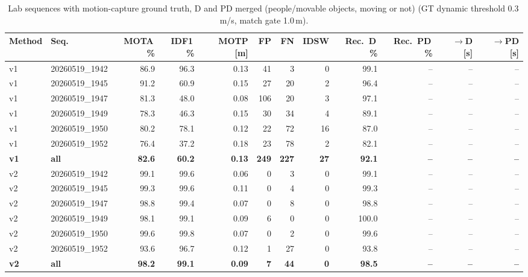 \begin{table}[t]
\centering
\caption{Lab sequences with motion-capture ground truth, D and PD merged (people/movable objects, moving or not) (GT dynamic threshold 0.3\,m/s, match gate 1.0\,m).}
\label{tab:own_r9a_merged}
\setlength{\tabcolsep}{3pt}
\begin{tabular}{llrrrrrrrrrr}
\toprule
Method & Seq. & MOTA\,\% & IDF1\,\% & MOTP [m] & FP & FN & IDSW & Rec.\ D\,\% & Rec.\ PD\,\% & $\to$D [s] & $\to$PD [s] \\
\midrule
v1 & 20260519\_1942 & 86.9 & 96.3 & 0.13 & 41 & 3 & 0 & 99.1 & -- & -- & -- \\
v1 & 20260519\_1945 & 91.2 & 60.9 & 0.15 & 27 & 20 & 2 & 96.4 & -- & -- & -- \\
v1 & 20260519\_1947 & 81.3 & 48.0 & 0.08 & 106 & 20 & 3 & 97.1 & -- & -- & -- \\
v1 & 20260519\_1949 & 78.3 & 46.3 & 0.15 & 30 & 34 & 4 & 89.1 & -- & -- & -- \\
v1 & 20260519\_1950 & 80.2 & 78.1 & 0.12 & 22 & 72 & 16 & 87.0 & -- & -- & -- \\
v1 & 20260519\_1952 & 76.4 & 37.2 & 0.18 & 23 & 78 & 2 & 82.1 & -- & -- & -- \\
\textbf{v1} & \textbf{all} & \textbf{82.6} & \textbf{60.2} & \textbf{0.13} & \textbf{249} & \textbf{227} & \textbf{27} & \textbf{92.1} & \textbf{--} & \textbf{--} & \textbf{--} \\
\midrule
v2 & 20260519\_1942 & 99.1 & 99.6 & 0.06 & 0 & 3 & 0 & 99.1 & -- & -- & -- \\
v2 & 20260519\_1945 & 99.3 & 99.6 & 0.11 & 0 & 4 & 0 & 99.3 & -- & -- & -- \\
v2 & 20260519\_1947 & 98.8 & 99.4 & 0.07 & 0 & 8 & 0 & 98.8 & -- & -- & -- \\
v2 & 20260519\_1949 & 98.1 & 99.1 & 0.09 & 6 & 0 & 0 & 100.0 & -- & -- & -- \\
v2 & 20260519\_1950 & 99.6 & 99.8 & 0.07 & 0 & 2 & 0 & 99.6 & -- & -- & -- \\
v2 & 20260519\_1952 & 93.6 & 96.7 & 0.12 & 1 & 27 & 0 & 93.8 & -- & -- & -- \\
\textbf{v2} & \textbf{all} & \textbf{98.2} & \textbf{99.1} & \textbf{0.09} & \textbf{7} & \textbf{44} & \textbf{0} & \textbf{98.5} & \textbf{--} & \textbf{--} & \textbf{--} \\
\bottomrule
\end{tabular}
\end{table}

